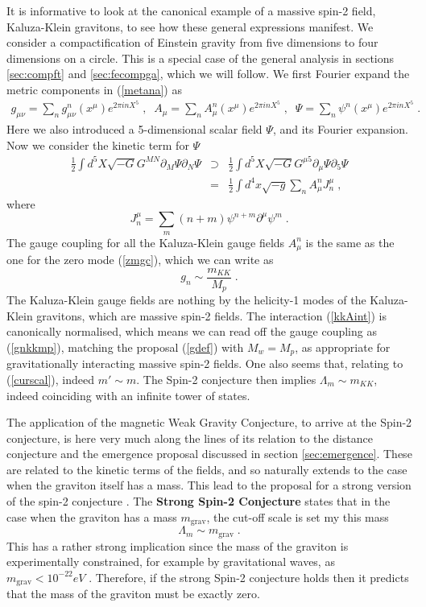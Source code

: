 \documentclass[11pt,a4paper]{article}
\numberwithin{equation}{section}
\numberwithin{table}{section}\setlength{\multlinegap}{25pt}
\newcommand{\bea}{\begin{eqnarray}}  \newcommand{\eea}{\end{eqnarray}}
\newcommand{\nn}{\nonumber}
\newcommand{\be}{\begin{equation}}
\newcommand{\ee}{\end{equation}}
\begin{document}
{It is informative to look at the canonical example of a massive spin-2 field, Kaluza-Klein gravitons, to see how these general expressions manifest. We consider a compactification of Einstein gravity from five dimensions to four dimensions on a circle. This is a special case of the general analysis in sections \ref{sec:compft} and \ref{sec:fecompga}, which we will follow. We first Fourier expand the metric components in (\ref{metana}) as
\bea
g_{\mu\nu} = \sum_n g_{\mu\nu}^n\left(x^{\mu} \right) e^{2 \pi i n X^5} \;,\;\; A_{\mu} = \sum_n A_{\mu}^n\left(x^{\mu} \right) e^{2 \pi i n X^5}\;,\;\; \Psi =  \sum_n \psi^n\left(x^{\mu} \right) e^{2 \pi i n X^5}\;.
\eea
Here we also introduced a 5-dimensional scalar field $\Psi$, and its Fourier expansion. Now we consider the kinetic term for $\Psi$
\bea
\frac12 \int d^5X \sqrt{-G} G^{MN} \partial_M \Psi \partial_N \Psi &\supset& \frac12 \int d^5X \sqrt{-G} G^{\mu5} \partial_{\mu} \Psi \partial_5 \Psi \nn \\
 &=& \frac12 \int d^4x \sqrt{-g} \sum_n A_{\mu}^n J_n^{\mu} \;,
 \label{kkAint}
\eea
where
\be
J_n^{\mu} = \sum_m \left(n+m\right) \psi^{n+m} \partial^{\mu} \psi^m \;. 
\ee
The gauge coupling for all the Kaluza-Klein gauge fields $A^n_{\mu}$ is the same as the one for the zero mode (\ref{zmgc}), which we can write as
\be
g_n \sim \frac{m_{KK}}{M_p} \;.
\label{gnkkmp}
\ee
The Kaluza-Klein gauge fields are nothing by the helicity-1 modes of the Kaluza-Klein gravitons, which are massive spin-2 fields. The interaction (\ref{kkAint}) is canonically normalised, which means we can read off the gauge coupling as (\ref{gnkkmp}), matching the proposal (\ref{gdef}) with $M_w=M_p$, as appropriate for gravitationally interacting massive spin-2 fields. One also seems that, relating to (\ref{curscal}), indeed $m' \sim m$. The Spin-2 conjecture then implies $\Lambda_m \sim m_{KK}$, indeed coinciding with an infinite tower of states. 

The application of the magnetic Weak Gravity Conjecture, to arrive at the Spin-2 conjecture, is here very much along the lines of its relation to the distance conjecture and the emergence proposal discussed in section \ref{sec:emergence}. These are related to the kinetic terms of the fields, and so naturally extends to the case when the graviton itself has a mass. This lead to the proposal for a strong version of the spin-2 conjecture \cite{Klaewer:2018yxi}. The {\bf Strong Spin-2 Conjecture} states that in the case when the graviton has a mass $m_{\mathrm{grav}}$, the cut-off scale is set my this mass
\be
\Lambda_m \sim m_{\mathrm{grav}} \;.
\label{Sspin2}
\ee
This has a rather strong implication since the mass of the graviton is experimentally constrained, for example by gravitational waves, as $m_{\mathrm{grav}} < 10^{-22} eV$ \cite{TheLIGOScientific:2016src}. Therefore, if the strong Spin-2 conjecture holds then it predicts that the mass of the graviton must be exactly zero.

}
\end{document}

